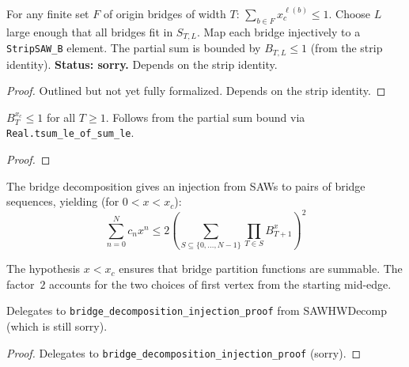 \begin{theorem}\label{thm:bridge_partial_sum}
\leanok
{}
  For any finite set $F$ of origin bridges of width $T$:
  $\sum_{b \in F} x_c^{\ell(b)} \leq 1$.
  Choose $L$ large enough that all bridges fit in $S_{T,L}$.
  Map each bridge injectively to a \texttt{StripSAW\_B} element.
  The partial sum is bounded by $B_{T,L} \leq 1$ (from the strip identity).
  \textbf{Status: sorry.} Depends on the strip identity.
\end{theorem}
\begin{proof}
  Outlined but not yet fully formalized. Depends on the strip identity.
\end{proof}

\begin{theorem}\label{thm:bridge_upper_from_strip}
\leanok
{}
  $B_T^{x_c} \leq 1$ for all $T \geq 1$.
  Follows from the partial sum bound via \texttt{Real.tsum\_le\_of\_sum\_le}.
\end{theorem}
\begin{proof}
\leanok
{}
\end{proof}

\begin{theorem}\label{thm:bridge_decomp_inj}
\leanok
{}
  The bridge decomposition gives an injection from SAWs to pairs of
  bridge sequences, yielding (for $0 < x < x_c$):
  \[\sum_{n=0}^{N} c_n x^n \leq 2 \left(\sum_{S \subseteq \{0,\ldots,N-1\}}
    \prod_{T \in S} B_{T+1}^x\right)^2\]

  The hypothesis $x < x_c$ ensures that bridge partition functions are summable.
  The factor~$2$ accounts for the two choices of first vertex from the
  starting mid-edge.

  Delegates to \texttt{bridge\_decomposition\_injection\_proof} from SAWHWDecomp
  (which is still sorry).
\end{theorem}
\begin{proof}
  Delegates to \texttt{bridge\_decomposition\_injection\_proof} (sorry).
\end{proof}

